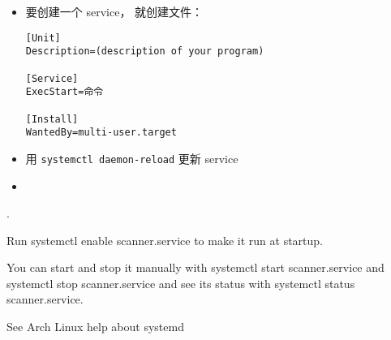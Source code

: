 
\begin{itemize}
\item 要创建一个 service， 就创建文件：
\begin{lstlisting}[language=none,caption=/etc/systemd/system/名字.service]
[Unit]
Description=(description of your program)

[Service]
ExecStart=命令

[Install]
WantedBy=multi-user.target
\end{lstlisting}
\item 用 \verb|systemctl daemon-reload| 更新 service
\item 
\end{itemize}


.

Run systemctl enable scanner.service to make it run at startup.

You can start and stop it manually with systemctl start scanner.service and systemctl stop scanner.service and see its status with systemctl status scanner.service.

See Arch Linux help about systemd